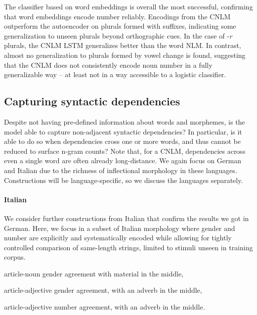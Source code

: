 The classifier based on word embeddings is overall the most successful, confirming that word embeddings encode number reliably.
Encodings from the CNLM outperform the autoencoder on plurals formed with suffixes, indicating some generalization to unseen plurals beyond orthographic cues.
In the case of -\emph{r} plurals, the CNLM LSTM generalizes better than the word NLM.
In contrast, almost no generalization to plurals formed by vowel change is found, suggesting that the CNLM does not consistently encode noun number in a fully generalizable way -- at least not in a way accessible to a logistic classifier.


\subsection{Capturing syntactic dependencies}
\label{sec:dependencies}

Despite not having pre-defined information about words and morphemes, is the model able to capture non-adjacent syntactic dependencies?
In particular, is it able to do so when dependencies cross one or more words, and thus cannot be reduced to surface n-gram counts?
Note that, for a CNLM, dependencies across even a single word are often already long-distance. %
We again focus on German and Italian due to the richness of inflectional morphology in these languages.
Constructions will be language-specific, so we discuss the languages separately. %


\paragraph{Italian} We consider further constructions from Italian that confirm the results we got in German.
Here, we focus in a  subset of Italian morphology where gender and number are explicitly and systematically
encoded while allowing for tightly controlled comparison of
same-length strings, limited to stimuli unseen in training corpus.
\begin{inparaenum}[i)]
\item article-noun gender agreement with material in the middle,
\item article-adjective gender agreement, with an adverb in the middle,
\item article-adjective number agreement, with an adverb in the middle.
\end{inparaenum}

